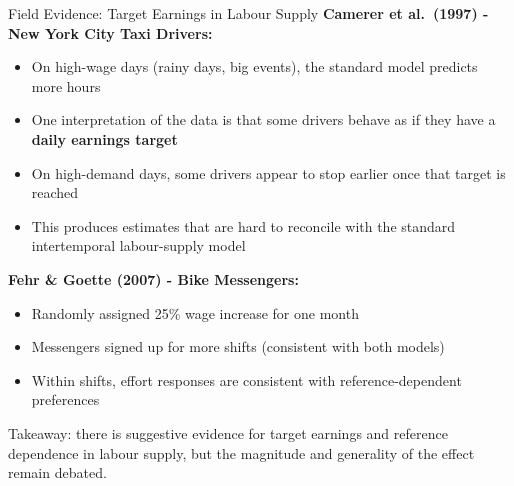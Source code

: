 \documentclass[10pt]{beamer}
\begin{document}
\begin{frame}[allowframebreaks]{Field Evidence: Target Earnings in Labour Supply}
\textbf{Camerer et al.\ (1997) - New York City Taxi Drivers:}

\begin{itemize}
\item On high-wage days (rainy days, big events), the standard model predicts \alert{more} hours
\item One interpretation of the data is that some drivers behave as if they have a \textbf{daily earnings target}
\item On high-demand days, some drivers appear to stop earlier once that target is reached
\item This produces estimates that are hard to reconcile with the standard intertemporal labour-supply model
\end{itemize}


\textbf{Fehr \& Goette (2007) - Bike Messengers:}
\begin{itemize}
\item Randomly assigned 25\% wage increase for one month
\item Messengers signed up for more shifts (consistent with both models)
\item Within shifts, effort responses are consistent with reference-dependent preferences
\end{itemize}


\footnotesize Takeaway: there is suggestive evidence for target earnings and reference dependence in labour supply, but the magnitude and generality of the effect remain debated.
\end{frame}
\end{document}
